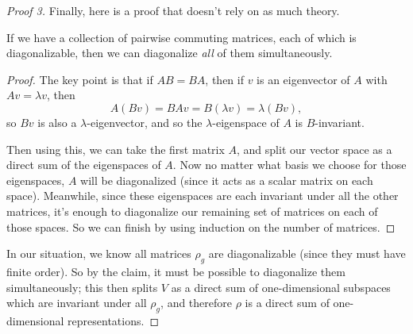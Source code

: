 \begin{proof}[Proof 3]
Finally, here is a proof that doesn't rely on as much theory. 

\begin{claim*}
If we have a collection of pairwise commuting matrices, each of which is diagonalizable, then we can diagonalize \emph{all} of them simultaneously. 
\end{claim*}

\begin{proof}
The key point is that if $AB = BA$, then if $v$ is an eigenvector of $A$ with $Av = \lambda v$, then \[A(Bv) = BAv = B(\lambda v) = \lambda(Bv),\] so $Bv$ is also a $\lambda$-eigenvector, and so the $\lambda$-eigenspace of $A$ is $B$-invariant. 

Then using this, we can take the first matrix $A$, and split our vector space as a direct sum of the eigenspaces of $A$. Now no matter what basis we choose for those eigenspaces, $A$ will be diagonalized (since it acts as a scalar matrix on each space). Meanwhile, since these eigenspaces are each invariant under all the other matrices, it's enough to diagonalize our remaining set of matrices on each of those spaces. So we can finish by using induction on the number of matrices. 
\end{proof}

In our situation, we know all matrices $\rho_g$ are diagonalizable (since they must have finite order). So by the claim, it must be possible to diagonalize them simultaneously; this then splits $V$ as a direct sum of one-dimensional subspaces which are invariant under all $\rho_g$, and therefore $\rho$ is a direct sum of one-dimensional representations. 
\end{proof}



